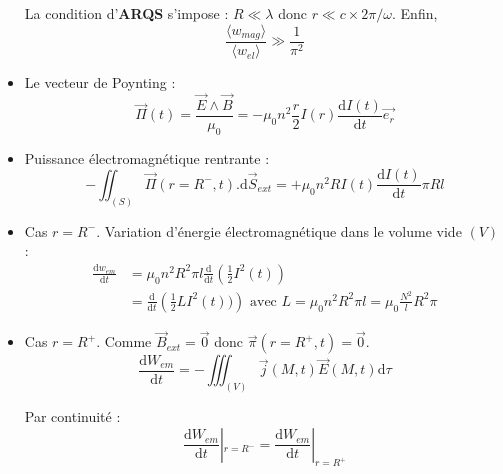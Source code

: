 \begin{itemize}
\begin{myproof}{}{}
      La condition d'\textbf{ARQS} s'impose : $R \ll \lambda$ donc $r \ll c \times 2 \pi /\omega$. 
      Enfin, 
      \begin{equation}
        \frac{ \langle w _{mag} \rangle}{ \langle w _{el} \rangle}  \gg \frac{1}{\pi ^{2}} 
      \end{equation}
      \end{myproof} 

    \item Le vecteur de Poynting : 
      \begin{equation}
        \overrightarrow{\Pi}(t) =  \frac{\overrightarrow{E} \wedge \overrightarrow{B}}{\mu_0}  = - \mu_0 n ^{2} \frac{r}{2}  I(r) \frac{\mathrm{d}I(t)}{\mathrm{d}t}  \overrightarrow{e_r}
      \end{equation}

    \item Puissance électromagnétique rentrante : 
      \begin{equation}
        - \iint _{(S)} \overrightarrow{\Pi}(r= R ^{-}, t) . \mathrm{d} \overrightarrow{S}_{ext} = + \mu_0 n ^{2} R I(t) \frac{\mathrm{d}I(t)}{\mathrm{d}t}  \pi R l
      \end{equation}
    \item Cas $r = R ^{-}$. Variation d'énergie électromagnétique dans le volume vide $(V)$ : 
      \begin{align}
        \frac{\mathrm{d} w _{em}}{ \mathrm{d}t}  &= \mu_0 n ^{2} R ^{2} \pi l \frac{\mathrm{d}}{\mathrm{d}t}  \left( \frac{1}{2}  I ^{2}(t) \right) \\ 
                                                 &= \frac{\mathrm{d}}{\mathrm{d}t}  \left( \frac{1}{2} LI ^{2}(t))
                                                 \right) \text{ avec } L = \mu_0 n ^{2} R ^{2} \pi l = \mu_0 \frac{N ^{2}}{l}  R ^{2} \pi
      \end{align}

    \item Cas $r = R ^{+}$. Comme $\overrightarrow{B} _{ext} = \overrightarrow{0}$ donc $\overrightarrow{\pi}(r = R ^{+}, t) = \overrightarrow{0}$. 
      \begin{equation}
        \frac{\mathrm{d} W _{em}}{\mathrm{d} t}  = - \iiint _{(V)} \overrightarrow{j}(M,t) \overrightarrow{E}(M,t) \mathrm{d} \tau
      \end{equation}

      Par continuité : 
      \begin{equation}
        \frac{\mathrm{d}W _{em}}{  \mathrm{d} t} | _{r = R ^{-}} = 
        \frac{\mathrm{d}W _{em}}{  \mathrm{d} t} | _{r = R ^{+}}
      \end{equation}


\end{itemize}
